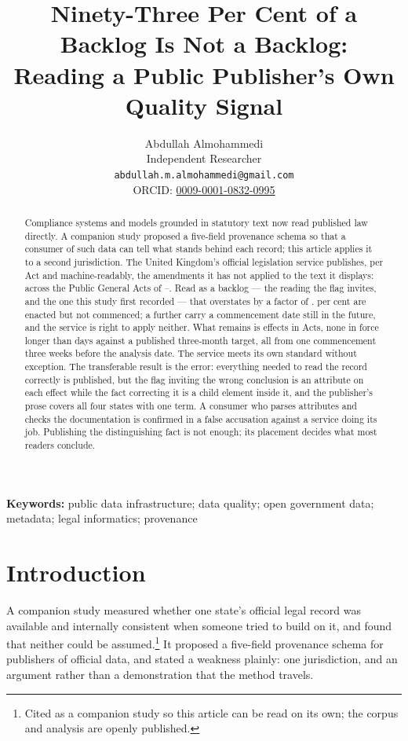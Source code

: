 \documentclass[11pt]{article}
\title{Ninety-Three Per Cent of a Backlog Is Not a Backlog:\\
Reading a Public Publisher's Own Quality Signal}
\author{}
\date{}
\author{Abdullah Almohammedi \\
    Independent Researcher \\
    \texttt{abdullah.m.almohammedi@gmail.com} \\
    ORCID: \href{https://orcid.org/0009-0001-0832-0995}{0009-0001-0832-0995}}
\date{}
\begin{document}
\maketitle

\begin{abstract}
\noindent
Compliance systems and models grounded in statutory text now read published
law directly. A companion study proposed a five-field provenance schema so that
a consumer of such data can tell what stands behind each record; this article
applies it to a second jurisdiction. The United Kingdom's official legislation service
publishes, per Act and machine-readably, the amendments it has not applied to
the text it displays: \nFlagged{} across the Public General Acts of
\nYearFrom{}--\nYearTo{}. Read as a backlog --- the reading the flag invites, and
the one this study first recorded --- that overstates by a factor of
\nOverstatementFactor. \nProspectiveShare{} per cent are enacted but not
commenced; a further \nScheduled{} carry a commencement date still in the
future, and the service is right to apply neither. What remains is
\nInForceNow{} effects in \nActsAffected{} Acts, none in force longer than
\nLongestDays{} days against a published three-month target, all from one
commencement three weeks before the analysis date. The service meets its own
standard without exception. The transferable result is the error: everything
needed to read the record correctly is published, but the flag inviting the
wrong conclusion is an attribute on each effect while the fact correcting it is
a child element inside it, and the publisher's prose covers all four states
with one term. A consumer who parses attributes and checks the documentation is confirmed in a
false accusation against a service doing its job. Publishing the distinguishing
fact is not enough; its placement decides what most readers conclude.
\end{abstract}

\vspace{1em}\noindent\textbf{Keywords:} public data infrastructure; data
quality; open government data; metadata; legal informatics; provenance
\vspace{1em}

\section{Introduction}

A companion study measured whether one state's official legal record was
available and internally consistent when someone tried to build on it, and
found that neither could be assumed.\footnote{Cited as a companion study so
this article can be read on its own; the corpus and analysis are openly
published.} It proposed a five-field provenance schema for publishers of
official data, and stated a weakness plainly: one jurisdiction, and an argument
rather than a demonstration that the method travels.
\end{document}
